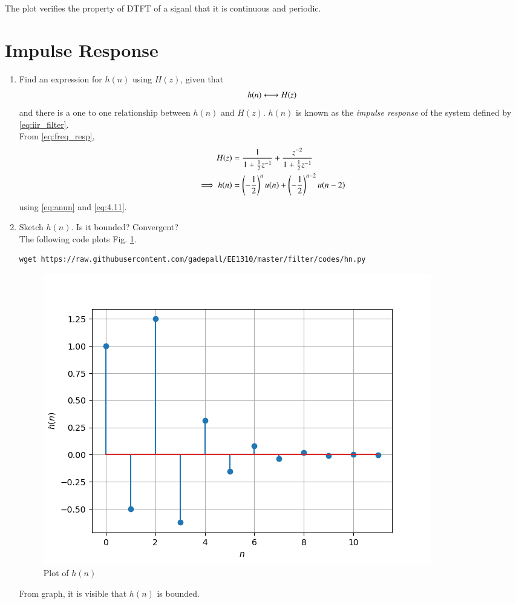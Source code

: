 \documentclass[journal,12pt,twocolumn]{IEEEtran}
\theoremstyle{remark}
\renewcommand\thesection{\arabic{section}}
\numberwithin{equation}{subsection}
\begin{document}
\begin{enumerate}[label=\thesection.\arabic*]
The plot verifies the property of DTFT of a siganl that it is continuous and periodic.
\end{enumerate}

\section{Impulse Response}
\begin{enumerate}[label=\thesection.\arabic*]
\item \label{prob:impulse_resp}
Find an expression for $h(n)$ using $H(z)$, given that 
\begin{equation}
\label{eq:impulse_resp}
h(n) \system H(z)
\end{equation}
and there is a one to one relationship between $h(n)$ and $H(z)$. $h(n)$ is known as the {\em impulse response} of the
system defined by \eqref{eq:iir_filter}.
\\
\solution From \eqref{eq:freq_resp},
\begin{align}
H(z) &= \frac{1}{1 + \frac{1}{2}z^{-1}} + \frac{ z^{-2}}{1 + \frac{1}{2}z^{-1}}
\\
\implies h(n) &= \left(-\frac{1}{2}\right)^{n}u(n) + \left(-\frac{1}{2}\right)^{n-2}u(n-2)
\end{align}
using \eqref{eq:anun} and \eqref{eq:4.11}.
\item Sketch $h(n)$. Is it bounded? Convergent? 
\\
\solution The following code plots Fig. \ref{fig:hn}.
\begin{lstlisting}
wget https://raw.githubusercontent.com/gadepall/EE1310/master/filter/codes/hn.py
\end{lstlisting}
\begin{figure}[!ht]
\centering
\includegraphics[width=\columnwidth]{figs/5.2.png}
\caption{Plot of $h(n)$}
\label{fig:hn}
\end{figure}
From graph, it is visible that $h(n)$ is bounded.


\end{enumerate}
\end{document}
